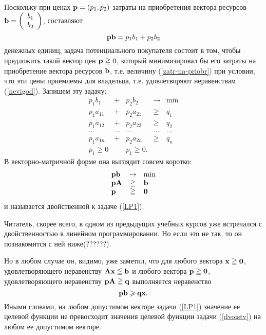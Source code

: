     Поскольку при ценах $\mathbf{p}=(p_{1},p_{2})$
    затраты на приобретения вектора ресурсов $\mathbf{b}=\left(
               \begin{array}{c}
                 b_{1} \\
                 b_{2} \\
               \end{array}
             \right)$,
    составляют
\begin{equation} \label{zatr-na-priobr}
    \mathbf{p}\mathbf{b}=p_{1}b_{1}+p_{2}b_{2}
\end{equation}
    денежных единиц,
    задача потенциального покупателя состоит в том, чтобы
    предложить такой вектор цен $\mathbf{p}\geqq0$, который
    минимизировал бы его затраты на приобретение вектора ресурсов
    $\mathbf{b}$, т.е. величину (\ref{zatr-na-priobr}) при условии, что
    эти цены приемлемы для владельца, т.е. удовлетворяют
    неравенствам (\ref{nevigod}). Запишем эту задачу:
    \begin{equation}\label{dvoistv}
    \begin{array}{ccccc}
         p_{1}b_{1} & + & p_{2}b_{2} & \rightarrow & \min \\
         p_{1}a_{11} & + & p_{2}a_{21} & \geqslant & q_{1} \\
         p_{1}a_{12} & + & p_{2}a_{22} & \geqslant & q_{2} \\
         \ldots & \ldots & \ldots & \ldots & \ldots \\
         p_{1}a_{1n} & + & p_{2}a_{2n} & \geqslant & q_{n} \\
         p_{1}\geqslant0 &   & p_{1}\geqslant0. &  &
      \end{array}
\end{equation}
    В векторно-матричной форме она выглядит совсем коротко:
        \[\begin{array}{lcl}
        \mathbf{p}\mathbf{b} & \rightarrow & \min \\
        \mathbf{p}\mathbf{A}  & \geqq & \mathbf{b} \\
        \mathbf{p} & \geqq & \mathbf{0}
      \end{array}
    \]
    и называется двойственной к задаче (\ref{LP1}).

    Читатель,
    скорее всего, в одном из предыдущих учебных курсов уже
    встречался с двойственностью в линейном программировании. Но
    если это не так, то он познакомится с ней ниже(??????).


    Но в любом случае он,
    видимо, уже заметил, что для любого вектора $\mathbf{x}\geqq\mathbf{0}$,
    удовлетворяющего неравенству $\mathbf{A}\mathbf{x}\leqq\mathbf{b}$  и любого
    вектора $\mathbf{p}\geqq\mathbf{0}$, удовлетворяющего неравенству
    $\mathbf{p}\mathbf{A}\geqq\mathbf{q}$ выполняется неравенство
    \[\mathbf{p}\mathbf{b}\geqslant\mathbf{q}\mathbf{x}.\]
    Иными словами, на любом допустимом векторе задачи (\ref{LP1})
    значение ее целевой функции не превосходит значения
    целевой функции задачи (\ref{dvoistv}) на любом ее допустимом
    векторе.




